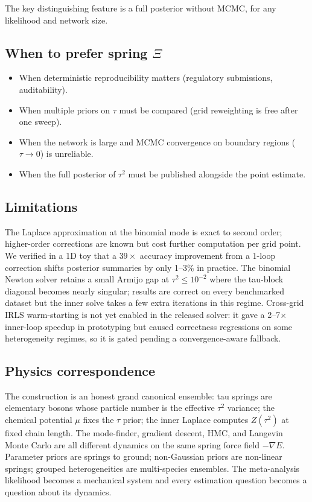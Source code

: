 \documentclass[12pt]{article}
\begin{document}
The key distinguishing feature is a full posterior without MCMC,
for any likelihood and network size.

\subsection{When to prefer spring $\Xi$}

\begin{itemize}
\item When deterministic reproducibility matters (regulatory
submissions, auditability).
\item When multiple priors on $\tau$ must be compared (grid
reweighting is free after one sweep).
\item When the network is large and MCMC convergence on boundary
regions ($\tau \to 0$) is unreliable.
\item When the full posterior of $\tau^2$ must be published
alongside the point estimate.
\end{itemize}

\subsection{Limitations}

The Laplace approximation at the binomial mode is exact to
second order; higher-order corrections are known but cost
further computation per grid point. We verified in a 1D toy
that a $39 \times$ accuracy improvement from a 1-loop correction
shifts posterior summaries by only 1--3\% in practice. The
binomial Newton solver retains a small Armijo gap at
$\tau^2 \le 10^{-2}$ where the tau-block diagonal becomes
nearly singular; results are correct on every benchmarked
dataset but the inner solve takes a few extra iterations
in this regime. Cross-grid IRLS warm-starting is not yet
enabled in the released solver: it gave a 2--7$\times$
inner-loop speedup in prototyping but caused correctness
regressions on some heterogeneity regimes, so it is gated
pending a convergence-aware fallback.

\subsection{Physics correspondence}

The construction is an honest grand canonical ensemble: tau
springs are elementary bosons whose particle number is the
effective $\tau^2$ variance; the chemical potential $\mu$ fixes
the $\tau$ prior; the inner Laplace computes $Z(\tau^2)$ at fixed
chain length. The mode-finder, gradient descent, HMC, and
Langevin Monte Carlo are all different dynamics on the same
spring force field $-\nabla E$. Parameter priors are springs to
ground; non-Gaussian priors are non-linear springs; grouped
heterogeneities are multi-species ensembles. The meta-analysis
likelihood becomes a mechanical system and every estimation
question becomes a question about its dynamics.



\end{document}
